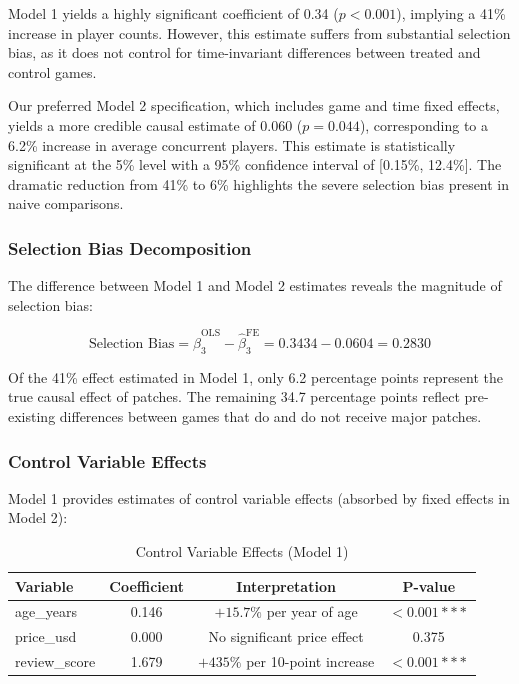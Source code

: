 \documentclass[12pt,a4paper]{article}
\begin{document}
Model 1 yields a highly significant coefficient of 0.34 ($p<0.001$), implying a 41\% increase in player counts. However, this estimate suffers from substantial selection bias, as it does not control for time-invariant differences between treated and control games.

Our preferred Model 2 specification, which includes game and time fixed effects, yields a more credible causal estimate of 0.060 ($p=0.044$), corresponding to a 6.2\% increase in average concurrent players. This estimate is statistically significant at the 5\% level with a 95\% confidence interval of [0.15\%, 12.4\%]. The dramatic reduction from 41\% to 6\% highlights the severe selection bias present in naive comparisons.

\subsubsection{Selection Bias Decomposition}

The difference between Model 1 and Model 2 estimates reveals the magnitude of selection bias:

\begin{equation}
\text{Selection Bias} = \hat{\beta}_3^{\text{OLS}} - \hat{\beta}_3^{\text{FE}} = 0.3434 - 0.0604 = 0.2830
\end{equation}

Of the 41\% effect estimated in Model 1, only 6.2 percentage points represent the true causal effect of patches. The remaining 34.7 percentage points reflect pre-existing differences between games that do and do not receive major patches.

\subsubsection{Control Variable Effects}

Model 1 provides estimates of control variable effects (absorbed by fixed effects in Model 2):

\begin{table}[H]
\centering
\caption{Control Variable Effects (Model 1)}
\label{tab:controls}
\begin{tabular}{lccc}
\toprule
\textbf{Variable} & \textbf{Coefficient} & \textbf{Interpretation} & \textbf{P-value} \\
\midrule
age\_years & 0.146 & $+15.7\%$ per year of age & $<0.001***$ \\
price\_usd & 0.000 & No significant price effect & 0.375 \\
review\_score & 1.679 & $+435\%$ per 10-point increase & $<0.001***$ \\
\bottomrule
\end{tabular}
\end{table}
\end{document}
